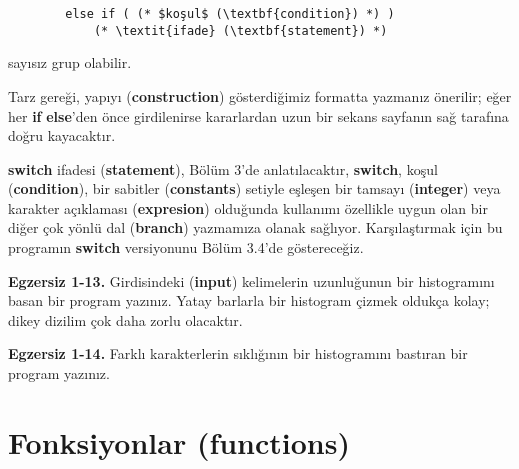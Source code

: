 \documentclass[a4paper,12pt,oneside]{book}
\begin{document}
\begin{lstlisting}
		else if ( (* $koşul$ (\textbf{condition}) *) )
			(* \textit{ifade} (\textbf{statement}) *)
\end{lstlisting}
sayısız grup olabilir.
\par Tarz gereği, yapıyı (\textbf{construction}) gösterdiğimiz formatta yazmanız önerilir; eğer her \textbf{if} \textbf{else}'den önce girdilenirse kararlardan uzun bir sekans sayfanın sağ tarafına doğru kayacaktır.
\par \textbf{switch} ifadesi (\textbf{statement}), Bölüm 3'de anlatılacaktır, \textbf{switch}, koşul (\textbf{condition}), bir sabitler (\textbf{constants}) setiyle eşleşen bir tamsayı (\textbf{integer}) veya karakter açıklaması (\textbf{expresion}) olduğunda kullanımı özellikle uygun olan bir diğer çok yönlü dal (\textbf{branch}) yazmamıza olanak sağlıyor. Karşılaştırmak için bu programın \textbf{switch} versiyonunu Bölüm 3.4'de göstereceğiz. \newline


\noindent \textbf{Egzersiz 1-13.} Girdisindeki (\textbf{input}) kelimelerin uzunluğunun bir histogramını basan bir program yazınız. Yatay barlarla bir histogram çizmek oldukça kolay; dikey dizilim çok daha zorlu olacaktır. \newline


\noindent \textbf{Egzersiz 1-14.} Farklı karakterlerin sıklığının bir histogramını bastıran bir program yazınız.

\section{Fonksiyonlar (functions)}
\end{document}
